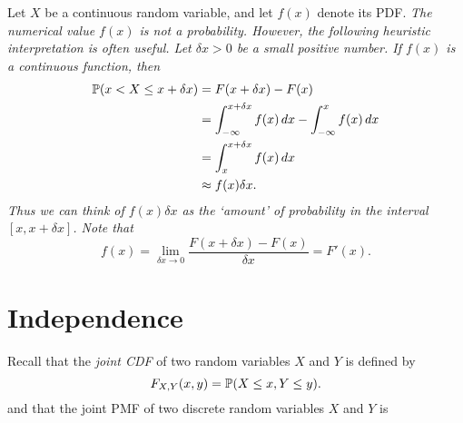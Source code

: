 %
%

\begin{remark}
Let $X$ be a continuous random variable, and let $f(x)$ denote its PDF. 
\bit
\it The numerical value $f(x)$ is \emph{not} a probability. 
\eit
However, the following heuristic interpretation is often useful.
%
Let $\delta x >0$ be a small positive number. If $f(x)$ is a continuous function, then
\begin{align*}
\mathbb{P}(x < X \leq x+\delta x) 	
	& = F(x+\delta x) - F(x) \\
	& = \int_{-\infty}^{x+\delta x} f(x)\,dx - \int_{-\infty}^{x} f(x)\,dx \\
	& = \int_{x}^{x+\delta x} f(x)\,dx \\
	& \approx f(x)\delta x.
\end{align*}
Thus we can think of $f(x)\delta x$ as the `amount' of probability in the interval $[x,x+\delta x]$. Note that
\[
f(x) = \lim_{\delta x \to 0} \frac{F(x+\delta x) - F(x)}{\delta x} = F'(x).
\]
\end{remark}

\section{Independence}
Recall that the \emph{joint CDF} of two random variables $X$ and $Y$ is defined by
\[
F_{X,Y}(x,y) = \mathbb{P}(X\leq x, Y\leq y).
\]
and that the joint PMF of two discrete random variables $X$ and $Y$ is

